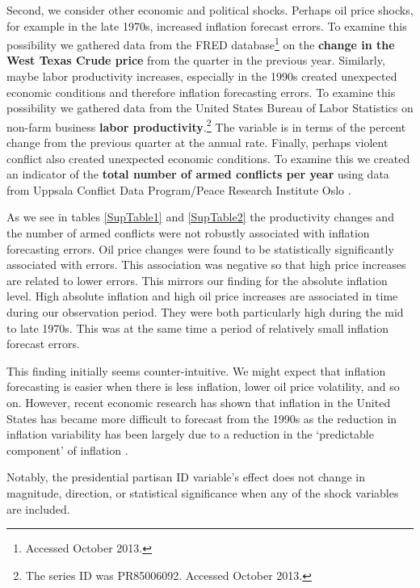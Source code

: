\documentclass[a4paper]{article}
\begin{document}
Second, we consider other economic and political shocks. Perhaps oil price shocks, for example in the late 1970s, increased inflation forecast errors. To examine this possibility we gathered data from the FRED database\footnote{Accessed October 2013.} on the \textbf{change in the West Texas Crude price} from the quarter in the previous year. Similarly, maybe labor productivity increases, especially in the 1990s created unexpected economic conditions and therefore inflation forecasting errors. To examine this possibility we gathered data from the United States Bureau of Labor Statistics on non-farm business \textbf{labor productivity}.\footnote{The series ID was PR85006092. Accessed October 2013.} The variable is in terms of the percent change from the previous quarter at the annual rate. Finally, perhaps violent conflict also created unexpected economic conditions. To examine this we created an indicator of the \textbf{total number of armed conflicts per year} using data from Uppsala Conflict Data Program/Peace Research Institute Oslo \citep{Harbom2012,Gleditsch2002}. 

As we see in tables \ref{SupTable1} and \ref{SupTable2} the productivity changes and the number of armed conflicts were not robustly associated with inflation forecasting errors. Oil price changes were found to be statistically significantly associated with errors. This association was negative so that high price increases are related to lower errors. This mirrors our finding for the absolute inflation level. High absolute inflation and high oil price increases are associated in time during our observation period. They were both particularly high during the mid to late 1970s. This was at the same time a period of relatively small inflation forecast errors. 

This finding initially seems counter-intuitive. We might expect that inflation forecasting is easier when there is less inflation, lower oil price volatility, and so on. However, recent economic research has shown that inflation in the United States has became more difficult to forecast from the 1990s as the reduction in inflation variability has been largely due to a reduction in the `predictable component' of inflation \citep[see][]{Gamber2009}. 

Notably, the presidential partisan ID variable's effect does not change in magnitude, direction, or statistical significance when any of the shock variables are included.
\end{document}
